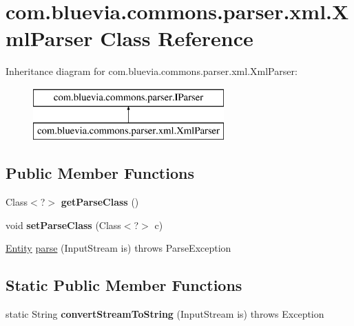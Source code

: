 \hypertarget{classcom_1_1bluevia_1_1commons_1_1parser_1_1xml_1_1XmlParser}{
\section{com.bluevia.commons.parser.xml.XmlParser Class Reference}
\label{classcom_1_1bluevia_1_1commons_1_1parser_1_1xml_1_1XmlParser}
}
Inheritance diagram for com.bluevia.commons.parser.xml.XmlParser:\begin{figure}[H]
\begin{center}
\leavevmode
\includegraphics[height=2.000000cm]{classcom_1_1bluevia_1_1commons_1_1parser_1_1xml_1_1XmlParser}
\end{center}
\end{figure}
\subsection*{Public Member Functions}
\begin{DoxyCompactItemize}
\item 
\hypertarget{classcom_1_1bluevia_1_1commons_1_1parser_1_1xml_1_1XmlParser_ae7181e4e5613afbb4545dd167ce9dd83}{
Class$<$?$>$ {\bfseries getParseClass} ()}
\label{classcom_1_1bluevia_1_1commons_1_1parser_1_1xml_1_1XmlParser_ae7181e4e5613afbb4545dd167ce9dd83}

\item 
\hypertarget{classcom_1_1bluevia_1_1commons_1_1parser_1_1xml_1_1XmlParser_a239b8847f407e79af6b72442c4a92b2c}{
void {\bfseries setParseClass} (Class$<$?$>$ c)}
\label{classcom_1_1bluevia_1_1commons_1_1parser_1_1xml_1_1XmlParser_a239b8847f407e79af6b72442c4a92b2c}

\item 
\hyperlink{interfacecom_1_1bluevia_1_1commons_1_1Entity}{Entity} \hyperlink{classcom_1_1bluevia_1_1commons_1_1parser_1_1xml_1_1XmlParser_a40b67f6e8d70d841ee3a07e0d41c5050}{parse} (InputStream is)  throws ParseException 
\end{DoxyCompactItemize}
\subsection*{Static Public Member Functions}
\begin{DoxyCompactItemize}
\item 
\hypertarget{classcom_1_1bluevia_1_1commons_1_1parser_1_1xml_1_1XmlParser_a2785524ca69f70285c67391d53a25e57}{
static String {\bfseries convertStreamToString} (InputStream is)  throws Exception }
\label{classcom_1_1bluevia_1_1commons_1_1parser_1_1xml_1_1XmlParser_a2785524ca69f70285c67391d53a25e57}

\end{DoxyCompactItemize}


